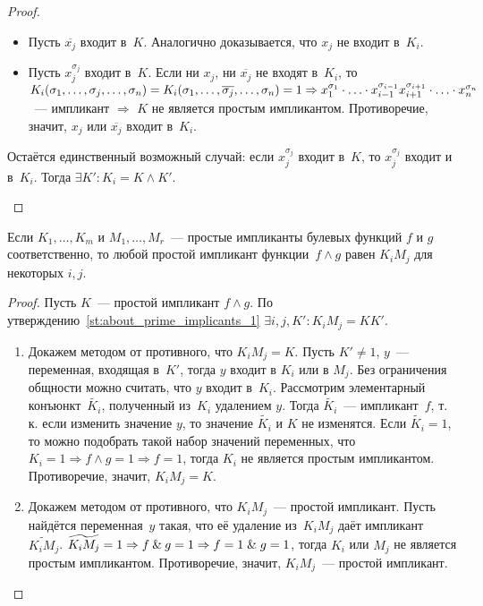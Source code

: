 \begin{proof}
\begin{itemize}
\begin{itemize}
		\item Пусть $\overline{x_j}$ входит в~$K$.
		Аналогично доказывается, что $x_j$ не входит в~$K_i$.
		
		\item Пусть $x_j^{\sigma_j}$ входит в~$K$.
		Если ни $x_j$, ни $\overline{x_j}$ не входят в~$K_i$, то $K_i(\sigma_1, \ldots, \sigma_j, \ldots, \sigma_n) \opbr=
		K_i(\sigma_1, \ldots, \overline{\sigma_j}, \ldots, \sigma_n) \opbr= 1 \opbr\Rightarrow
		x_1^{\sigma_1} \cdot \ldots \cdot x_{i-1}^{\sigma_{i-1}} x_{i+1}^{\sigma_{i+1}} \cdot \ldots \cdot x_n^{\sigma_n}$~--- импликант $\Rightarrow$ $K$ не является простым импликантом.
		Противоречие, значит, $x_j$ или $\overline{x_j}$ входит в~$K_i$.
	\end{itemize}
	
	Остаётся единственный возможный случай: если $x_j^{\sigma_j}$ входит в~$K$, то $x_j^{\sigma_j}$ входит и в~$K_i$.
	Тогда $\exists K' \colon K_i = K \land K'$.
\end{itemize}
\end{proof}

\begin{statement}
\label{st:prime_implicants_of_conjuction}
Если $K_1, \ldots, K_m$ и $M_1, \ldots, M_r$~--- простые импликанты булевых функций $f$ и $g$ соответственно, то любой простой импликант функции~$f \land g$ равен $K_i M_j$ для некоторых $i, j$.
\end{statement}
\begin{proof}
Пусть $K$~--- простой импликант $f \land g$.
По утверждению~\ref*{st:about_prime_implicants_1} $\exists i, j, K' \colon K_i M_j = K K'$.
\begin{enumerate}
	\item Докажем методом от противного, что $K_i M_j = K$.
	Пусть $K' \neq 1$, $y$~--- переменная, входящая в~$K'$, тогда $y$ входит в $K_i$ или в $M_j$.
	Без ограничения общности можно считать, что $y$ входит в~$K_i$.
	Рассмотрим элементарный конъюнкт~$\widetilde{K_i}$, полученный из~$K_i$ удалением $y$.
	Тогда $\widetilde{K_i}$~--- импликант~$f$, т.\,к. если изменить значение $y$, то значение $\widetilde{K_i}$ и $K$ не изменятся.
	Если $\widetilde{K_i} = 1$, то можно подобрать такой набор значений переменных, что $K_i = 1 \Rightarrow f \land g = 1 \Rightarrow f = 1$, тогда $K_i$ не является простым импликантом.
	Противоречие, значит, $K_i M_j = K$.
	
	\item Докажем методом от противного, что $K_i M_j$~--- простой импликант.
	Пусть найдётся переменная~$y$ такая, что её удаление из~$K_i M_j$ даёт импликант~$\widetilde{K_i M_j}$.
	$\widetilde{K_i M_j} = 1 \Rightarrow f \mathbin{\&} g = 1 \Rightarrow f = 1 \mathrel{\&} g = 1$, тогда $K_i$ или $M_j$ не является простым импликантом.
	Противоречие, значит, $K_i M_j$~--- простой импликант.
\end{enumerate}
\end{proof}

